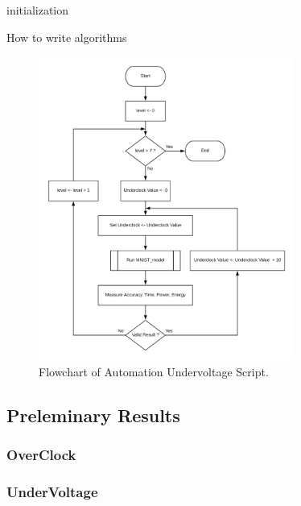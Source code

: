 \begin{algorithm}[H]
\SetAlgoLined
{}
 initialization\;
 \caption{How to write algorithms}
\end{algorithm}

\begin{figure}[!htb]
  \centering
  \includegraphics[width=0.75\textwidth]{Figures/DL/Underclock_Program.png}
  \caption[]{Flowchart of Automation Undervoltage Script.}
  \label{fig:undervoltage_program}
\end{figure}





\subsection{Preleminary Results}
\label{section:dvfseffects}

\subsubsection{OverClock}
\label{section:underclock}

\subsubsection{UnderVoltage}




